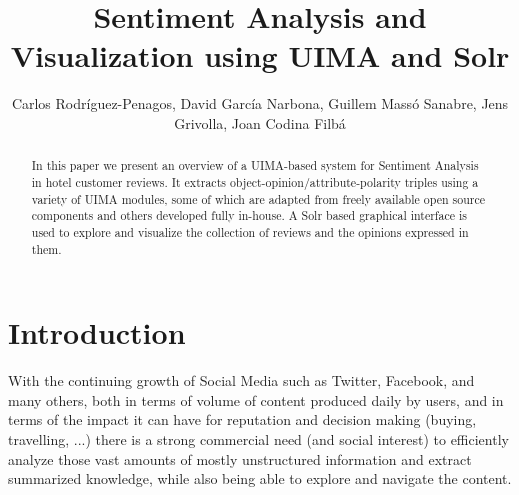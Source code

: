 \documentclass{llncs}
\title{Sentiment Analysis and Visualization using UIMA and Solr}
\author{Carlos Rodríguez-Penagos, David García Narbona, Guillem Massó Sanabre, Jens Grivolla, Joan Codina Filbá}
\institute{Barcelona Media Innovation Centre}
\begin{document}
\maketitle

\begin{abstract}
In this paper we present an overview of a UIMA-based system for Sentiment Analysis in hotel customer reviews. It extracts object-opinion/attribute-polarity triples using a variety of UIMA modules, some of which are adapted from freely available open source components and others developed fully in-house. A Solr based graphical interface is used to explore and visualize the collection of reviews and the opinions expressed in them.
\end{abstract}

\section{Introduction}

With the continuing growth of Social Media such as Twitter, Facebook, and many others, both in terms of volume of content produced daily by users, and in terms of the impact it can have for reputation and decision making (buying, travelling, ...) there is a strong commercial need (and social interest) to efficiently analyze those vast amounts of mostly unstructured information and extract summarized knowledge, while also being able to explore and navigate the content.
\end{document}
